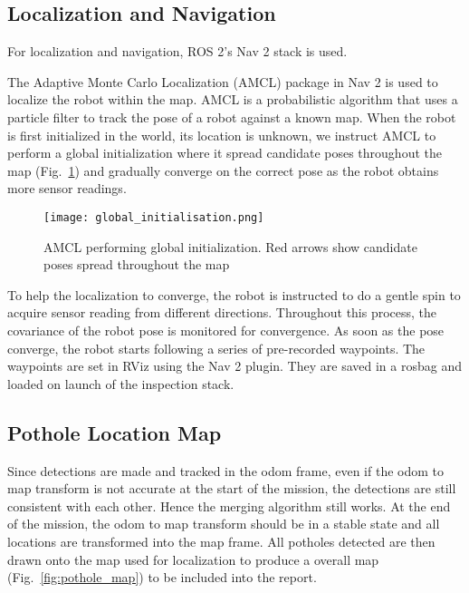 \documentclass[conference]{IEEEtran}
\begin{document}
\subsection{Localization and Navigation}

For localization and navigation, ROS 2's Nav 2 \cite{macenskiMarathonNavigationSystem2020} stack is used.

The Adaptive Monte Carlo Localization (AMCL) package in Nav 2 is used to localize the robot within the map. AMCL is a probabilistic algorithm that uses a particle filter to track the pose of a robot against a known map. When the robot is first initialized in the world, its location is unknown, we instruct AMCL to perform a global initialization where it spread candidate poses throughout the map (Fig.~\ref{fig:global_initialisation}) and gradually converge on the correct pose as the robot obtains more sensor readings.

\begin{figure}
    \centering
    \texttt{[image: global\_initialisation.png]}
    \caption{AMCL performing global initialization. Red arrows show candidate poses spread throughout the map}
    \label{fig:global_initialisation}
\end{figure}

To help the localization to converge, the robot is instructed to do a gentle spin to acquire sensor reading from different directions. Throughout this process, the covariance of the robot pose is monitored for convergence. As soon as the pose converge, the robot starts following a series of pre-recorded waypoints. The waypoints are set in RViz using the Nav 2 plugin. They are saved in a rosbag and loaded on launch of the inspection stack.

\subsection{Pothole Location Map}

Since detections are made and tracked in the odom frame, even if the odom to map transform is not accurate at the start of the mission, the detections are still consistent with each other. Hence the merging algorithm still works. At the end of the mission, the odom to map transform should be in a stable state and all locations are transformed into the map frame. All potholes detected are then drawn onto the map used for localization to produce a overall map (Fig.~\ref{fig:pothole_map}) to be included into the report.
\end{document}
